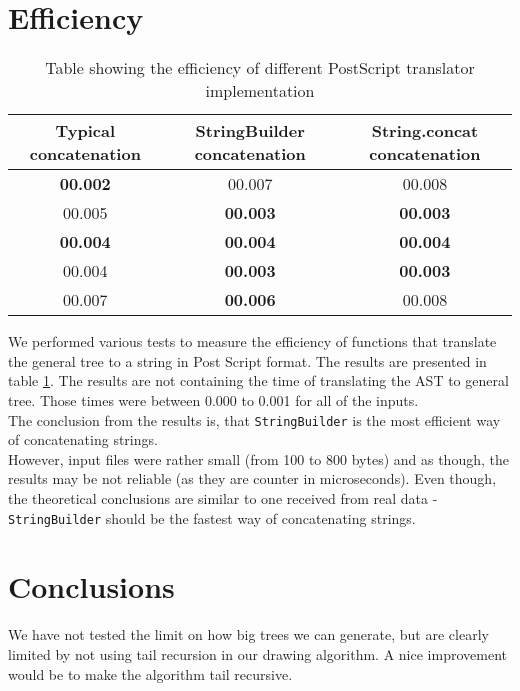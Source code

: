 \documentclass[10pt]{scrartcl}
\begin{document}
\section{Efficiency}
\begin{table} [!h]
\centering
\begin{tabular}{c|c|c}
  \textbf{Typical concatenation}  & \textbf{StringBuilder concatenation} & \textbf{String.concat concatenation} \\
  \hline
  \textbf{00.002} & 00.007 & 00.008 \\
  \hline
  00.005 & \textbf{00.003} & \textbf{00.003} \\
  \hline
  \textbf{00.004} & \textbf{00.004} & \textbf{00.004} \\
  \hline
  00.004 & \textbf{00.003} & \textbf{00.003} \\
  \hline
  00.007 & \textbf{00.006} & 00.008 \\
\end{tabular} 
\caption{Table showing the efficiency of different PostScript translator implementation}
\label{tab:eff}
\end{table}
We performed various  tests to measure the efficiency of functions that translate the general tree to a string in Post Script format. The results are presented in table \ref{tab:eff}. The results are not containing the time of translating the AST to general tree. Those times were between 0.000 to 0.001 for all of the inputs. \\
The conclusion from the results is, that \texttt{StringBuilder} is the most efficient way of concatenating strings. \\
However, input files were rather small (from 100 to 800 bytes) and as though, the results may be not reliable (as they are counter in microseconds). Even though, the theoretical conclusions are similar to one received from real data - \texttt{StringBuilder} should be the fastest way of concatenating strings. 
\section{Conclusions}
We have not tested the limit on how big trees we can generate, but are clearly limited by not using tail recursion in our drawing algorithm. A nice improvement would be to make the algorithm tail recursive.



\end{document}

